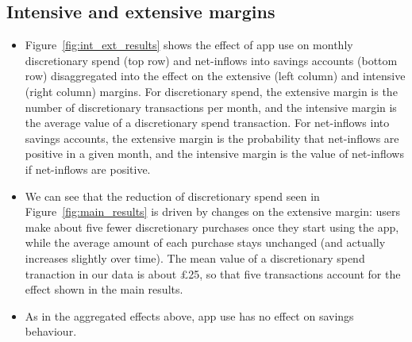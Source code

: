 \subsection{Intensive and extensive margins}%
\label{sub:intensive_and_extensive_margins}

\begin{itemize}

    \item Figure~\ref{fig:int_ext_results} shows the effect of app use on
        monthly discretionary spend (top row) and net-inflows into savings
        accounts (bottom row) disaggregated into the effect on the extensive
        (left column) and intensive (right column) margins. For discretionary
        spend, the extensive margin is the number of discretionary transactions
        per month, and the intensive margin is the average value of a
        discretionary spend transaction. For net-inflows into savings accounts,
        the extensive margin is the probability that net-inflows are positive
        in a given month, and the intensive margin is the value of net-inflows
        if net-inflows are positive.

    \item We can see that the reduction of discretionary spend seen in
        Figure~\ref{fig:main_results} is driven by changes on the extensive
        margin: users make about five fewer discretionary purchases once they
        start using the app, while the average amount of each purchase stays
        unchanged (and actually increases slightly over time). The mean value
        of a discretionary spend tranaction in our data is about \pounds25, so
        that five transactions account for the effect shown in the main
        results.

    \item As in the aggregated effects above, app use has no effect on savings
        behaviour.

\end{itemize}


